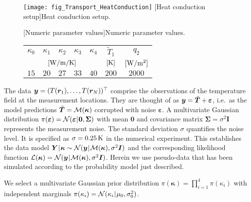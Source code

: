 \begin{figure}[ht]
  \centering
  \begin{minipage}[c]{0.47\textwidth}
    \centering
    \texttt{[image: fig\_Transport\_HeatConduction]}
    [Heat conduction setup]{Heat conduction setup.}
    \label{fig:Transport:HeatConduction}
  \end{minipage}%
  \begin{minipage}[c]{0.53\textwidth}
    [Numeric parameter values]{Numeric parameter values.}
    \label{tab:Transport:HeatConduction}
    \centering
    \begin{tabular}{ccccccc}
      \toprule
      \(\kappa_0\) & \(\kappa_1\) & \(\kappa_2\) & \(\kappa_3\) & \(\kappa_4\) & \(\tilde{T}_1\) & \(q_2\) \\
      \multicolumn{5}{c}{\([\unit[]{W/m/K}]\)} & \([\unit[]{K}]\) & \([\unit[]{W/m^2}]\) \\
      \midrule
      \(15\) & \(20\) & \(27\) & \(33\) & \(40\) & \(200\)& \(2000\) \\
      \bottomrule
    \end{tabular}
  \end{minipage}%
\end{figure}
\par %
The data \(\bm{y} = (T(\bm{r}_1),\ldots,T(\bm{r}_N))^\top\) comprise the observations of the temperature field at the measurement locations.
They are thought of as \(\bm{y} = \tilde{\bm{T}} + \bm{\varepsilon}\), i.e.\ as the model predictions \(\tilde{\bm{T}} = \mathcal{M}(\bm{\kappa})\) corrupted with noise \(\bm{\varepsilon}\).
A multivariate Gaussian distribution \(\pi(\bm{\varepsilon}) = \mathcal{N}(\bm{\varepsilon} {\:\!}|{\:\!} \bm{0},\bm{\Sigma})\) with mean \(\bm{0}\)
and covariance matrix \(\bm{\Sigma} = \sigma^2 \bm{I}\) represents the measurement noise.
The standard deviation \(\sigma\) quantifies the noise level.
It is specified as \(\sigma = \unit[0.25]{K}\) in the numerical experiment.
This establishes the data model \(\bm{Y} {\:\!}|{\:\!} \bm{\kappa} \sim \mathcal{N}(\bm{y} {\:\!}|{\:\!} \mathcal{M}(\bm{\kappa}),\sigma^2 \bm{I})\)
and the corresponding likelihood function \(\mathcal{L}(\bm{\kappa}) = \mathcal{N}(\bm{y} {\:\!}|{\:\!} \mathcal{M}(\bm{\kappa}),\sigma^2 \bm{I})\).
Herein we use pseudo-data that has been simulated according to the probability model just described.
\par %
We select a multivariate Gaussian prior distribution \(\pi(\bm{\kappa}) = \prod_{i=1}^4 \pi(\kappa_i)\) with independent marginals \(\pi(\kappa_i) = \mathcal{N}(\kappa_i {\:\!}|{\:\!} \mu_0,\sigma_0^2)\).
